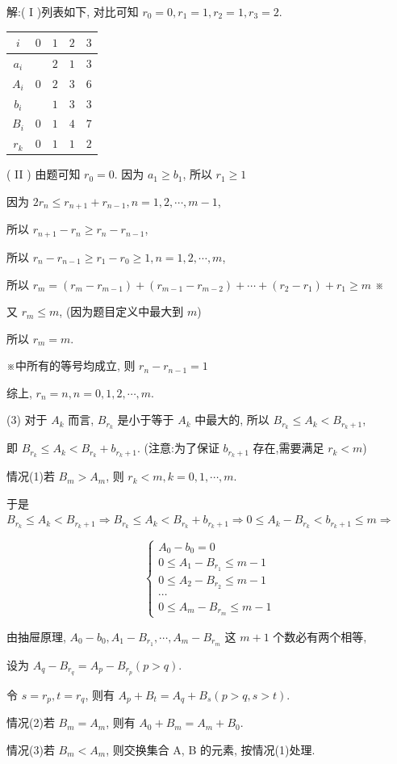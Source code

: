 \begin{solutions}
解:( I )列表如下, 对比可知 $r_0=0, r_1=1, r_2=1, r_3=2$.

\begin{center}
\begin{tabular}{|c|c|c|c|c|}
\hline
$i$ & $0$ & $1$ & $2$ & $3$ \\
\hline
$a_i$ & & $2$ & $1$ & $3$  \\
\hline
$A_i$ & $0$ & $2$ & $3$ & $6$ \\
\hline
$b_i$ & & $1$ & $3$ & $3$ \\
\hline
$B_i$ & $0$ & $1$ & $4$ & $7$ \\
\hline
$r_k$ & $0$ & $1$ & $1$ & $2$ \\
\hline
\end{tabular}
\end{center}

( II ) 由题可知 $r_0=0$. 因为 $a_1 \geqslant b_1$, 所以 $r_1 \geqslant 1$

因为 $2r_n \leqslant r_{n+1} + r_{n-1}, n=1, 2, \cdots, m-1$,

所以 $r_{n+1} - r_n \geqslant r_n - r_{n-1}$,

所以 $r_n - r_{n-1} \geqslant r_1 - r_0 \geqslant 1, n=1, 2, \cdots, m$,

所以 $r_m = (r_m - r_{m-1}) + (r_{m-1} - r_{m-2}) + \cdots + (r_2 - r_1) + r_1 \geqslant m$ ※

又 $r_m \leqslant m$, (因为题目定义中最大到 $m$)

所以 $r_m=m$.

※中所有的等号均成立, 则 $r_n - r_{n-1} = 1$

综上, $r_n=n, n=0, 1, 2, \cdots, m$.

(3) 对于 $A_k$ 而言, $B_{r_k}$ 是小于等于 $A_k$ 中最大的, 所以 $B_{r_k} \leqslant A_k < B_{r_k+1}$,

即 $B_{r_k} \leqslant A_k < B_{r_k} + b_{r_k+1}$. (注意:为了保证 $b_{r_k+1}$ 存在,需要满足 $r_k < m$)

情况(1)若 $B_m > A_m$, 则 $r_k < m, k=0, 1, \cdots, m$.

于是 $B_{r_k} \leqslant A_k < B_{r_k+1} \Rightarrow B_{r_k} \leqslant A_k < B_{r_k} + b_{r_k+1} \Rightarrow 0 \leqslant A_k - B_{r_k} < b_{r_k+1} \leqslant m \Rightarrow$

$$
\begin{cases}
A_0 - b_0 = 0 \\
0 \leqslant A_1 - B_{r_1} \leqslant m-1 \\
0 \leqslant A_2 - B_{r_2} \leqslant m-1 \\
\cdots \\
0 \leqslant A_m - B_{r_m} \leqslant m-1
\end{cases}
$$

由抽屉原理, $A_0-b_0, A_1-B_{r_1}, \cdots, A_m-B_{r_m}$ 这 $m+1$ 个数必有两个相等,

设为 $A_q - B_{r_q} = A_p - B_{r_p} (p>q)$.

令 $s=r_p, t=r_q$, 则有 $A_p + B_t = A_q + B_s (p>q, s>t)$.

情况(2)若 $B_m = A_m$, 则有 $A_0 + B_m = A_m + B_0$.

情况(3)若 $B_m < A_m$, 则交换集合 A, B 的元素, 按情况(1)处理.
\end{solutions}